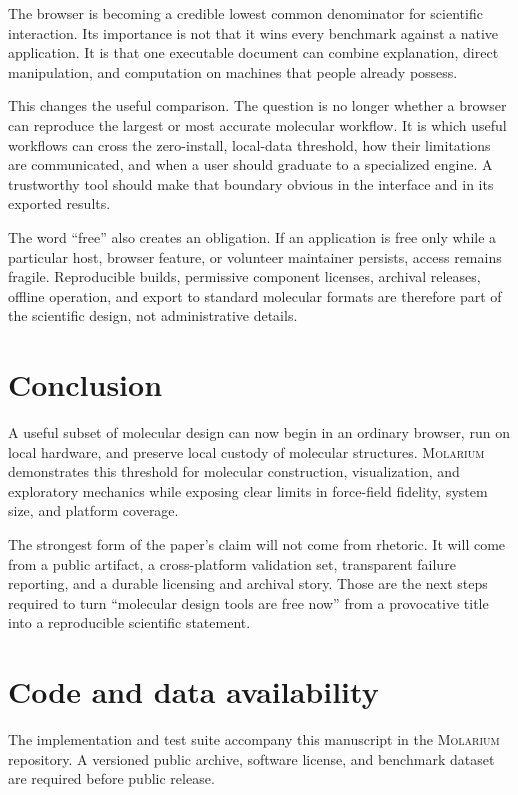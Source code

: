 \documentclass[11pt]{article}
\newcommand{\molarium}{\textsc{Molarium}}
\begin{document}
The browser is becoming a credible lowest common denominator for scientific
interaction.
Its importance is not that it wins every benchmark against a native application.
It is that one executable document can combine explanation, direct manipulation,
and computation on machines that people already possess.

This changes the useful comparison.
The question is no longer whether a browser can reproduce the largest or most
accurate molecular workflow.
It is which useful workflows can cross the zero-install, local-data threshold,
how their limitations are communicated, and when a user should graduate to a
specialized engine.
A trustworthy tool should make that boundary obvious in the interface and in its
exported results.

The word ``free'' also creates an obligation.
If an application is free only while a particular host, browser feature, or
volunteer maintainer persists, access remains fragile.
Reproducible builds, permissive component licenses, archival releases, offline
operation, and export to standard molecular formats are therefore part of the
scientific design, not administrative details.

\section{Conclusion}
\label{sec:conclusion}

A useful subset of molecular design can now begin in an ordinary browser, run on
local hardware, and preserve local custody of molecular structures.
\molarium{} demonstrates this threshold for molecular construction, visualization,
and exploratory mechanics while exposing clear limits in force-field fidelity,
system size, and platform coverage.

The strongest form of the paper's claim will not come from rhetoric.
It will come from a public artifact, a cross-platform validation set, transparent
failure reporting, and a durable licensing and archival story.
Those are the next steps required to turn ``molecular design tools are free now''
from a provocative title into a reproducible scientific statement.

\section*{Code and data availability}

The implementation and test suite accompany this manuscript in the \molarium{}
repository.
A versioned public archive, software license, and benchmark dataset are required
before public release.
\end{document}
